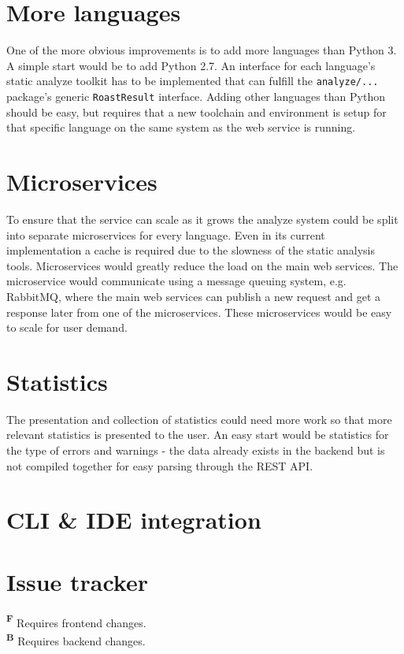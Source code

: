 \documentclass[12pt,a4paper]{report}
\begin{document}
\section{More languages}
One of the more obvious improvements is to add more languages than Python 3. A simple start would be to add Python 2.7. An interface for each language's static analyze toolkit has to be implemented that can fulfill the \texttt{analyze/...} package's generic \texttt{RoastResult} interface. Adding other languages than Python should be easy, but requires that a new toolchain and environment is setup for that specific language on the same system as the web service is running.

\section{Microservices}
To ensure that the service can scale as it grows the analyze system could be split into separate microservices for every language. Even in its current implementation a cache is required due to the slowness of the static analysis tools. Microservices would greatly reduce the load on the main web services. The microservice would communicate using a message queuing system, e.g. RabbitMQ, where the main web services can publish a new request and get a response later from one of the microservices. These microservices would be easy to scale for user demand.

\section{Statistics}
The presentation and collection of statistics could need more work so that more relevant statistics is presented to the user. An easy start would be statistics for the type of errors and warnings - the data already exists in the backend but is not compiled together for easy parsing through the REST API.

\section{CLI \& IDE integration}

\section{Issue tracker}
\label{sec:issue-tracker}
\textbf{\textsuperscript{F}} Requires frontend changes. \\
\textbf{\textsuperscript{B}} Requires backend changes.
\end{document}
